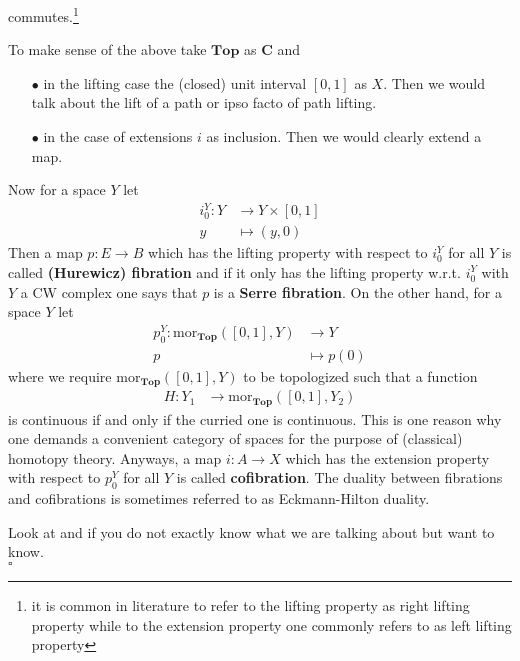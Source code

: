 commutes.\footnote{it is common in literature to refer to the lifting property as right lifting property while to the extension property one commonly refers to as left lifting property}
\\
\begin{exa}
\label{exa:liftextintop}
To make sense of the above take $\mathbf{Top}$ as $\mathbf{C}$ and
\begin{enumerate}
\item[$\bullet$]
in the lifting case the (closed) unit interval $[0,1]$ as $X$. Then we would talk about the lift of a path or ipso facto of {\glqq}path lifting{\grqq}.
\item[$\bullet$]
in the case of extensions $i$ as inclusion. Then we would clearly extend a map.
\end{enumerate}
Now for a space $Y$ let
\begin{align*}
  i_{0}^{Y}
  \colon
  Y
  &\rightarrow
  Y
  \times
  [0,1]
  \\
  y
  &\mapsto
  (y,0)
\end{align*}
Then a map $p \colon E \rightarrow B$ which has the lifting property with respect to $i_{0}^{Y}$ for all $Y$ is called \textbf{(Hurewicz) fibration} and if it only has the lifting property w.r.t. $i_{0}^{Y}$ with $Y$ a CW complex one says that $p$ is a \textbf{Serre fibration}. On the other hand, for a space $Y$ let
\begin{align*}
  p_{0}^{Y}
  \colon
  \mathrm{mor}_{\mathbf{Top}}([0,1],Y)
  &\rightarrow
  Y
  \\
  p
  &\mapsto
  p(0)
\end{align*}
where we require $\mathrm{mor}_{\mathbf{Top}}([0,1],Y)$ to be topologized such that a function
\begin{align*}
  H
  \colon
  Y_{1}
  &\rightarrow
  \mathrm{mor}_{\mathbf{Top}}([0,1],Y_{2})
\end{align*}
is continuous if and only if the curried one is continuous. This is one reason why one demands a convenient category of spaces for the purpose of (classical) homotopy theory. Anyways, a map $i \colon A \rightarrow X$ which has the extension property with respect to $p_{0}^{Y}$ for all $Y$ is called \textbf{cofibration}. The duality between fibrations and cofibrations is sometimes referred to as Eckmann-Hilton duality.
\end{exa}
\begin{prf}
Look at \cite{8b5861fc} and \cite{78202e13} if you do not exactly know what we are talking about but want to know.
\\
\phantom{proven}
\hfill
$\square$
\end{prf}
